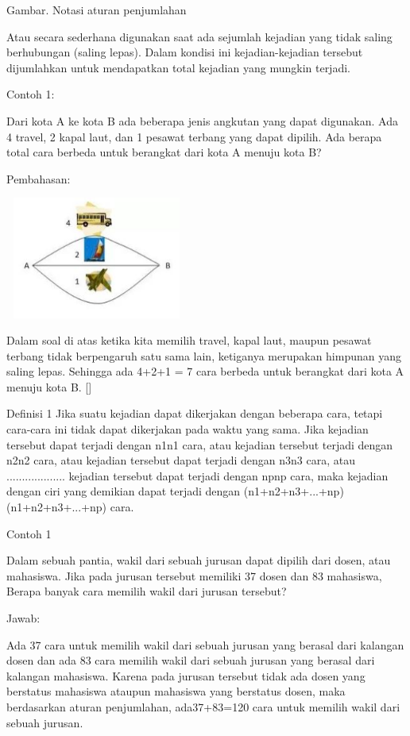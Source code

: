 \documentclass[11pt,fleqn]{book} %
\begin{document}
 
 Gambar. Notasi aturan penjumlahan
 
 Atau secara sederhana digunakan saat ada sejumlah kejadian yang tidak saling berhubungan (saling lepas). Dalam kondisi ini kejadian-kejadian tersebut dijumlahkan untuk mendapatkan total kejadian yang mungkin terjadi.

Contoh 1:

Dari kota A ke kota B ada beberapa jenis angkutan yang dapat digunakan. Ada 4 travel, 2 kapal laut, dan 1 pesawat terbang yang dapat dipilih. Ada berapa total cara berbeda untuk berangkat dari kota A menuju kota B?

Pembahasan:


\includegraphics[width = 6cm, height= 4cm]{Pictures/contoh1.JPG}

	Dalam soal di atas ketika kita memilih travel, kapal laut, maupun pesawat terbang tidak berpengaruh satu sama lain, ketiganya merupakan himpunan yang saling lepas. Sehingga ada 4+2+1 = 7 cara berbeda untuk berangkat dari kota A menuju kota B. []

Definisi 1
Jika suatu kejadian dapat dikerjakan dengan beberapa cara, tetapi cara-cara ini tidak dapat dikerjakan pada waktu yang sama.
Jika kejadian tersebut dapat terjadi dengan n1n1 cara, atau
kejadian tersebut terjadi dengan n2n2 cara, atau
kejadian tersebut dapat terjadi dengan n3n3 cara, atau
...................
kejadian tersebut dapat terjadi dengan npnp cara,
maka kejadian dengan ciri yang demikian dapat terjadi dengan 
(n1+n2+n3+...+np)(n1+n2+n3+...+np) cara.

Contoh 1

Dalam sebuah pantia, wakil dari sebuah jurusan dapat dipilih dari dosen, atau mahasiswa. Jika pada jurusan tersebut memiliki 37 dosen dan 83 mahasiswa, Berapa banyak cara memilih wakil dari jurusan tersebut?

Jawab:

Ada 37 cara untuk memilih wakil dari sebuah jurusan yang berasal dari kalangan dosen dan ada 83 cara memilih wakil dari sebuah jurusan yang berasal dari kalangan mahasiswa. Karena pada jurusan tersebut tidak ada dosen yang berstatus mahasiswa ataupun mahasiswa yang berstatus dosen, maka berdasarkan aturan penjumlahan, ada37+83=120 cara untuk memilih wakil dari sebuah jurusan. 
\end{document}
